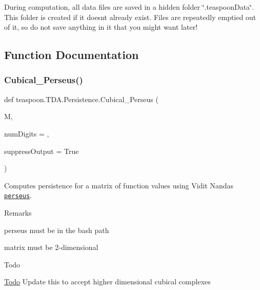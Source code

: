During computation, all data files are saved in a hidden folder \char`\"{}.\+teaspoon\+Data\char`\"{}. This folder is created if it doesn\textquotesingle{}t already exist. Files are repeatedly emptied out of it, so do not save anything in it that you might want later!

\subsection{Function Documentation}
\mbox{\label{namespaceteaspoon_1_1_t_d_a_1_1_persistence_aa583aa9a694aeaa3983e77319ac68e84}}
\subsubsection{\texorpdfstring{Cubical\+\_\+\+Perseus()}{Cubical\_Perseus()}}
{\footnotesize\ttfamily def teaspoon.\+T\+D\+A.\+Persistence.\+Cubical\+\_\+\+Perseus (\begin{DoxyParamCaption}\item[{}]{M,  }\item[{}]{num\+Digits = {},  }\item[{}]{suppress\+Output = {\ttfamily True} }\end{DoxyParamCaption})}



Computes persistence for a matrix of function values using Vidit Nanda\textquotesingle{}s \href{http://people.maths.ox.ac.uk/nanda/perseus/index.html}{\tt perseus}.

\begin{DoxyRemark}{Remarks}

\begin{DoxyItemize}
\item perseus must be in the bash path
\item matrix must be 2-\/dimensional
\end{DoxyItemize}
\end{DoxyRemark}
\begin{DoxyRefDesc}{Todo}
\item[\hyperlink{todo__todo000005}{Todo}]Update this to accept higher dimensional cubical complexes\end{DoxyRefDesc}



